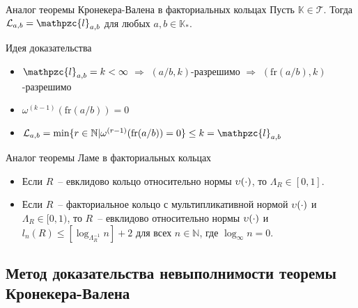 \documentclass[8pt, xcolor=x11names]{beamer}
\begin{document}
\begin{frame}
    \begin{block}{Аналог теоремы Кронекера-Валена в факториальных кольцах}
        Пусть $\mathbb{K}\in\mathcal{T}$.
        Тогда $\mathcal{L}_{a,b}=\mathpzc{l}_{a,b}$ для любых $a,b\in\mathbb{K}_{*}$.
    \end{block}
    
    \begin{block}{Идея доказательства}
        \begin{itemize}
            \item $\mathpzc{l}_{a,b} = k < \infty$ $\Rightarrow$ $(a/b, k)$-разрешимо $\Rightarrow$ $(\textrm{fr}(a/b), k)$-разрешимо
            
            \item $\omega^{(k-1)}(\textrm{fr}(a/b)) = 0$
            
            \item $\mathcal{L}_{a,b}=\textrm{min}\{r\in\mathbb{N}|\omega^{(r-1)}(\textrm{fr}(a/b))=0\}\le k=\mathpzc{l}_{a,b}$
        \end{itemize}
    \end{block}

    \begin{block}{Аналог теоремы Ламе в факториальных кольцах}
        \begin{itemize}
            \item Если $R$~-- евклидово кольцо относительно нормы $\upsilon(\cdot)$, то $\Lambda_R \in [0, 1]$.

            \item Если $R$~-- факториальное кольцо с мультипликативной нормой $\upsilon(\cdot)$ и $\Lambda_R \in [0, 1)$, то $R$~-- евклидово относительно нормы $\upsilon(\cdot)$ и $l_n(R) \le [\log_{\Lambda_R^{-1}} n] + 2$ для всех $n \in \mathbb{N}$, где $\log_{\infty} n = 0$.
        \end{itemize}
    \end{block}
\end{frame}

\subsection{Метод доказательства невыполнимости теоремы Кронекера-Валена}
\end{document}
